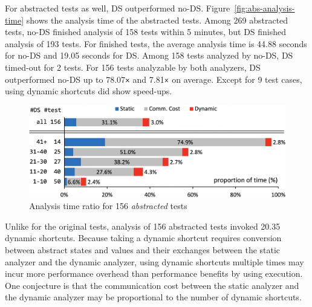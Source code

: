 For abstracted tests as well, DS outperformed no-DS.
Figure~\ref{fig:abs-analysis-time} shows the analysis time of the abstracted tests.
Among 269 abstracted tests, no-DS finished analysis of 158 tests within 5 minutes,
but DS finished analysis of 193 tests.  For finished tests, the average analysis
time is 44.88 seconds for no-DS and 19.05 seconds for DS. Among 158 tests analyzed by no-DS, DS
timed-out for 2 tests.  For 156 tests analyzable by both analyzers,
DS outperformed no-DS up to 78.07${\textsf{x}}$ and 7.81${\textsf{x}}$ on average.
Except for 9 test cases, using dynamic shortcuts did show speed-ups.

\begin{figure}[t]
  \centering
  \includegraphics[width=\linewidth]{img/abs-analysis-ratio}
  \vspace*{-1.5em}
  \caption{Analysis time ratio for 156 \textit{abstracted} tests}
  \label{fig:abs-analysis-ratio}
  \vspace*{-1.5em}
\end{figure}

Unlike for the original tests, analysis of 156 abstracted tests invoked
20.35 dynamic shortcuts.  Because taking a dynamic shortcut
requires conversion between abstract states and {\sealed} values
and their exchanges between the static analyzer and the dynamic analyzer,
using dynamic shortcuts multiple times may incur more performance
overhead than performance benefits by using {\sealed} execution.
One conjecture is that the communication cost between the static
analyzer and the dynamic analyzer may be proportional to the number of
dynamic shortcuts.

